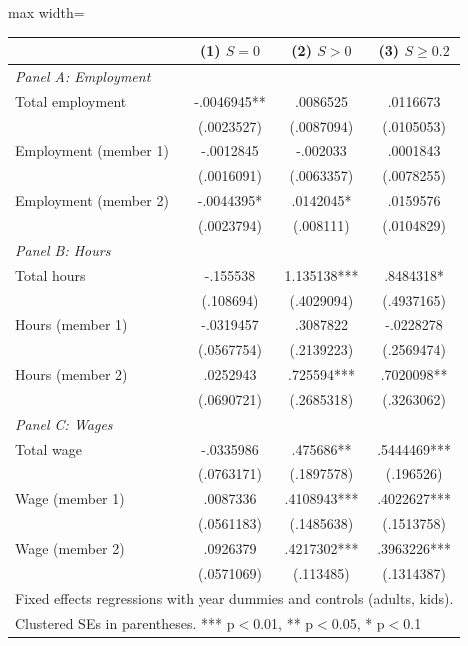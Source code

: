 \begin{adjustbox}{max width=\textwidth}
\begin{tabular}{lccc}
\toprule
 & (1) $S=0$ & (2) $S>0$ & (3) $S\geq 0.2$ \\
\midrule
\multicolumn{4}{l}{\textit{Panel A: Employment}} \\[0.3em]
Total employment & -.0046945** & .0086525 & .0116673 \\
 & (.0023527) & (.0087094) & (.0105053) \\[0.3em]
Employment (member 1) & -.0012845 & -.002033 & .0001843 \\
 & (.0016091) & (.0063357) & (.0078255) \\[0.3em]
Employment (member 2) & -.0044395* & .0142045* & .0159576 \\
 & (.0023794) & (.008111) & (.0104829) \\[0.3em]
\multicolumn{4}{l}{\textit{Panel B: Hours}} \\[0.3em]
Total hours & -.155538 & 1.135138*** & .8484318* \\
 & (.108694) & (.4029094) & (.4937165) \\[0.3em]
Hours (member 1) & -.0319457 & .3087822 & -.0228278 \\
 & (.0567754) & (.2139223) & (.2569474) \\[0.3em]
Hours (member 2) & .0252943 & .725594*** & .7020098** \\
 & (.0690721) & (.2685318) & (.3263062) \\[0.3em]
\multicolumn{4}{l}{\textit{Panel C: Wages}} \\[0.3em]
Total wage & -.0335986 & .475686** & .5444469*** \\
 & (.0763171) & (.1897578) & (.196526) \\[0.3em]
Wage (member 1) & .0087336 & .4108943*** & .4022627*** \\
 & (.0561183) & (.1485638) & (.1513758) \\[0.3em]
Wage (member 2) & .0926379 & .4217302*** & .3963226*** \\
 & (.0571069) & (.113485) & (.1314387) \\[0.3em]
\bottomrule
\multicolumn{4}{l}{\footnotesize Fixed effects regressions with year dummies and controls (adults, kids).} \\
\multicolumn{4}{l}{\footnotesize Clustered SEs in parentheses. *** p$<$0.01, ** p$<$0.05, * p$<$0.1} \\
\end{tabular}
\end{adjustbox}
